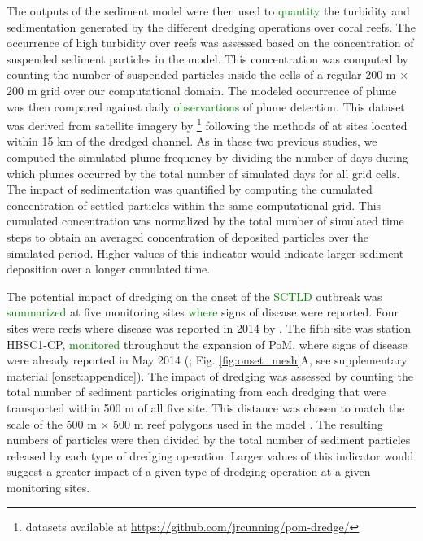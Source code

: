 \documentclass[preprint,12pt,authoryear]{elsarticle}
\newcommand{\modif}[1]{\textcolor{green}{#1}}
\begin{document}
The outputs of the sediment model were then used to \modif{quantity} the turbidity and sedimentation generated by the different dredging operations over coral reefs. The occurrence of high turbidity over reefs was assessed based on the concentration of suspended sediment particles in the model. This concentration was computed by counting the number of suspended particles inside the cells of a regular 200 m $\times$ 200 m grid over our computational domain. The modeled occurrence of plume was then compared against daily \modif{observartions} of plume detection. This dataset was derived from satellite imagery by \cite{cunning2019extensive}\footnote{datasets available at \url{https://github.com/jrcunning/pom-dredge/}} following the methods of \cite{barnes2015sediment} at sites located within 15 km of the dredged channel. As in these two previous studies, we computed  the simulated plume frequency by dividing the number of days during which plumes occurred by the total number of simulated days for all grid cells. The impact of sedimentation was quantified by computing the cumulated concentration of settled particles within the same computational grid. This cumulated concentration was normalized by the total number of simulated time steps to obtain an averaged concentration of deposited particles over the simulated period. Higher values of this indicator would indicate larger sediment deposition over a longer cumulated time.

The potential impact of dredging on the onset of the \modif{SCTLD} outbreak was \modif{summarized} at five monitoring sites \modif{where} signs of disease were reported. Four sites were reefs where disease was reported in 2014 by \cite{precht2016unprecedented}. The fifth site was station HBSC1-CP, \modif{monitored} throughout the expansion of PoM, where signs of disease were already reported in May 2014 (\citealp{dial2017}; Fig. \ref{fig:onset_mesh}A, see supplementary material \ref{onset:appendice}). The impact of dredging was assessed by counting the total number of sediment particles originating from each dredging that were transported within 500 m of all five site. This distance was chosen to match the scale of the 500 m $\times$ 500 m reef polygons used in the model \citep{dobbelaere2020coupled}. The resulting numbers of particles were then divided by the total number of sediment particles released by each type of dredging operation. Larger values of this indicator would suggest a greater impact of a given type of dredging operation at a given monitoring sites.  
\end{document}
